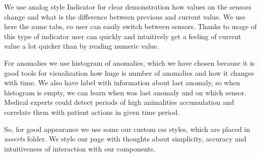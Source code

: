 \documentclass{article}
\begin{document}
We use analog style Indicator for clear demonstration how values on the sensors change and what is the difference between previous and current value. We use here the same tabs, co user can easily switch between sensors. Thanks to usage of this type of indicator user can quickly and intuitively get a feeling of current value a lot quicker than by reading numeric value.
\vspace{10pt}

For anomalies we use histogram of anomalies, which we have chosen because it is good tools for visualization how huge is number of anomalies and how it changes with time. We also have label with information about last anomaly, so when histogram is empty, we can learn when was last anomaly and on which sensor. Medical experts could detect periods of high animalities accumulation and correlate them with patient actions in given time period.
\vspace{10pt}

So, for good appearance we use some our custom css styles, which are placed in \textit{asserts} folder. We style our page with thoughts about simplicity, accuracy and intuitiveness of interaction with our components.
\end{document}
